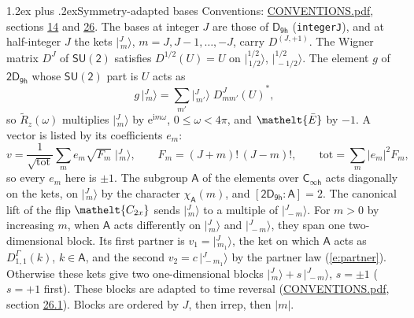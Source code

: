 \documentclass[10pt,a4paper]{article}
\makeatletter
\renewcommand\section{\@startsection{section}{1}{\z@}{-3ex plus -1ex minus -.2ex}%
  {1.2ex plus .2ex}{\normalfont\large\sffamily\bfseries\color{parttitle}}}
\numberwithin{equation}{section}
\newcommand{\eltfont}[1]{{\let\sigma\eltsigma\mathelt{#1}}}
\newcommand{\grp}[1]{\mathsf{#1}}
\newcommand{\elt}[1]{\eltfont{#1}}
\newcommand{\grpindex}[2]{[#1 : #2]}
\newcommand{\iunit}{\mathrm{i}}
\newcommand{\expe}{\mathrm{e}}
\newcommand{\irrJp}[2]{D^{(#1,#2)}}
\newcommand{\repD}[1]{D^{#1}}
\newcommand{\wignerD}[1]{D^{#1}}
\newcommand{\chiA}{\chi_{\grp{A}}}
\newcommand{\conj}[1]{{#1}^{*}}
\newcommand{\jm}[2]{\bigl\lvert{}^{#1}_{\,#2}\bigr\rangle}
\newcommand{\barred}[1]{\bar{#1}}
\newcommand{\lift}[1]{\tilde{#1}}
\makeatother
\begin{document}
\section{Symmetry-adapted bases}\label{s:bases}
Conventions: \href{../../CONVENTIONS.pdf}{CONVENTIONS.pdf}, sections \href{../../../rotation/CONVENTIONS.pdf\#conv.14}{14} and \href{../../CONVENTIONS.pdf\#conv.26}{26}.
\leavevmode\label{n:index.m}\label{n:vector.ket}The bases at integer $J$ are those of \href{../../../rotation/data/pdf/D9h.pdf}{$\grp{D_{9h}}$} (\texttt{integerJ}), and at half-integer $J$ the kets $\jm{J}{m}$, $m = J, J-1, \dots, -J$, carry $\irrJp{J}{+1}$. \label{n:matrix.wigner}The Wigner matrix $\wignerD{J}$ of $\grp{SU(2)}$ satisfies $\wignerD{1/2}(U) = U$ on $\jm{1/2}{1/2}$, $\jm{1/2}{-1/2}$. The element $g$ of $\grp{2D_{9h}}$ whose $\grp{SU(2)}$ part is $U$ acts as
\begin{equation}\label{e:action}g\,\jm{J}{m} = \sum_{m'} \jm{J}{m'}\; \conj{\wignerD{J}_{m m'}(U)},\end{equation}
so $\lift{R}_{z}(\omega)$ multiplies $\jm{J}{m}$ by $\expe^{\iunit m\omega}$, $0 \le \omega < 4\pi$, and $\elt{\barred{E}}$ by $-1$. \label{n:index.ketcoefficient}\label{n:vector.basis.symmetry}\label{n:index.ketweight}\label{n:index.total}A vector is listed by its coefficients $e_m$:
\begin{equation}\label{e:ket}v = \frac{1}{\sqrt{\mathrm{tot}}}\sum_m e_m\sqrt{F_m}\;\jm{J}{m},\qquad F_m = (J+m)!\,(J-m)!,\qquad \mathrm{tot} = \sum_m |e_m|^2F_m,\end{equation}
so every $e_m$ here is $\pm 1$.
\leavevmode\label{n:group.A}\label{n:function.character.abelian}The subgroup $\grp{A}$ of the elements over $\grp{C_{\infty h}}$ acts diagonally on the kets, on $\jm{J}{m}$ by the character $\chiA(m)$, and $\grpindex{\grp{2D_{9h}}}{\grp{A}} = 2$. The canonical lift of the flip $\elt{C_{2x}}$ sends $\jm{J}{m}$ to a multiple of $\jm{J}{-m}$. For $m > 0$ by increasing $m$, when $\grp{A}$ acts differently on $\jm{J}{m}$ and $\jm{J}{-m}$, they span one two-dimensional block. \label{n:index.partner.sign}Its first partner is $v_1 = \jm{J}{m_1}$, the ket on which $\grp{A}$ acts as $\repD{\Gamma}_{1,1}(k)$, $k \in \grp{A}$, and the second $v_2 = c\,\jm{J}{-m_1}$ by the partner law (\ref{e:partner}). \label{n:index.pair.sign}Otherwise these kets give two one-dimensional blocks $\jm{J}{m} + s\,\jm{J}{-m}$, $s = \pm 1$ ($s = +1$ first). These blocks are adapted to time reversal (\href{../../CONVENTIONS.pdf}{CONVENTIONS.pdf}, section \href{../../CONVENTIONS.pdf\#conv.26.1}{26.1}). Blocks are ordered by $J$, then irrep, then $|m|$.
\end{document}
